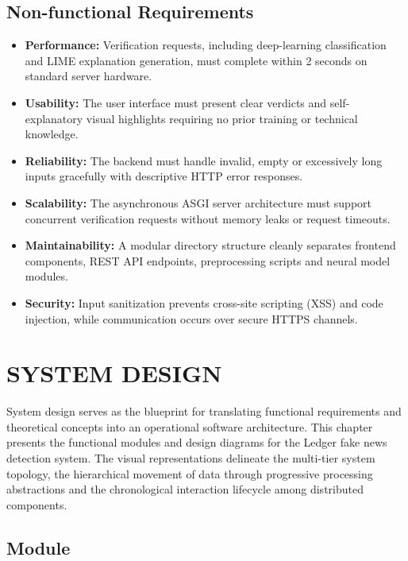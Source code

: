 \documentclass[12pt,a4paper,oneside]{report}
\begin{document}
\section{Non-functional Requirements}

\begin{itemize}[leftmargin=*, itemsep=2pt]
  \item \textbf{Performance:} Verification requests, including deep-learning classification and
        LIME explanation generation, must complete within 2 seconds on standard server hardware.
  \item \textbf{Usability:} The user interface must present clear verdicts and self-explanatory
        visual highlights requiring no prior training or technical knowledge.
  \item \textbf{Reliability:} The backend must handle invalid, empty or excessively long inputs
        gracefully with descriptive HTTP error responses.
  \item \textbf{Scalability:} The asynchronous ASGI server architecture must support concurrent
        verification requests without memory leaks or request timeouts.
  \item \textbf{Maintainability:} A modular directory structure cleanly separates frontend
        components, REST API endpoints, preprocessing scripts and neural model modules.
  \item \textbf{Security:} Input sanitization prevents cross-site scripting (XSS) and code
        injection, while communication occurs over secure HTTPS channels.
\end{itemize}

\chapter{SYSTEM DESIGN}

System design serves as the blueprint for translating functional requirements and
theoretical concepts into an operational software architecture. This chapter presents
the functional modules and design diagrams for the Ledger fake news detection system. The
visual representations delineate the multi-tier system topology, the hierarchical
movement of data through progressive processing abstractions and the chronological
interaction lifecycle among distributed components.

\section{Module}
\end{document}
